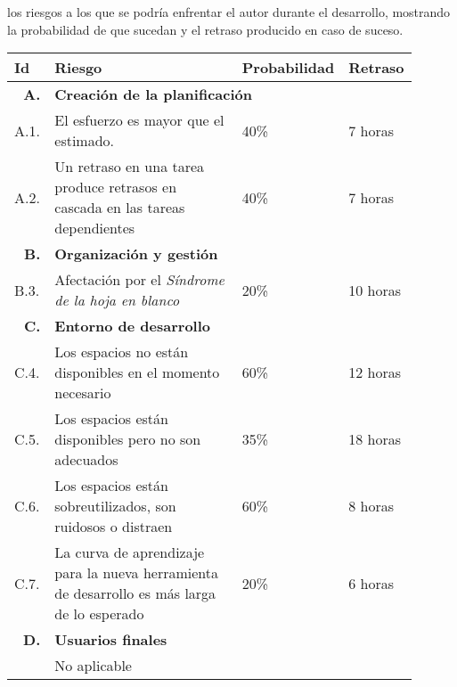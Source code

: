 	
	los riesgos a los que se podría enfrentar el autor durante el desarrollo, mostrando la probabilidad de que sucedan y el retraso producido en caso de suceso.
	
	\begin{table}[H]
	  \centering 
	  \begin{tabular}{p{0.1\linewidth}p{0.5\linewidth}p{0.15\linewidth}p{0.15\linewidth}}
  	    \multicolumn{1}{l}{\cellcolor{black!30}\textbf{Id}} &
	    \multicolumn{1}{l}{\cellcolor{black!30}\textbf{Riesgo}} & 
	 	\multicolumn{1}{c}{\cellcolor{black!30}\textbf{Probabilidad}} &
 	 	\multicolumn{1}{c}{\cellcolor{black!30}\textbf{Retraso}}
	 	\\	 
	    \toprule
   	    
   	    \multicolumn{1}{r}{\cellcolor{black!30}\textbf{A. }} &
		\multicolumn{3}{l}{\cellcolor{black!30}\textbf{Creación de la planificación}}\\
		A.1. &El esfuerzo es mayor que el estimado.											&	40\%	&	7 horas\\
		A.2. &Un retraso en una tarea produce retrasos en cascada en las tareas dependientes 	&	40\%	&	7 horas\\
		
		\multicolumn{1}{r}{\cellcolor{black!30}\textbf{B. }} &
		\multicolumn{3}{l}{\cellcolor{black!30}\textbf{Organización y gestión}}\\
		B.3. &Afectación por el \textit{Síndrome de la hoja en blanco}							&	20\%	&	10 horas\\
		
		\multicolumn{1}{r}{\cellcolor{black!30}\textbf{C. }} &
		\multicolumn{3}{l}{\cellcolor{black!30}\textbf{Entorno de desarrollo}}\\
		C.4. &Los espacios no están disponibles en el momento necesario						&	60\%	&	12 horas\\
		C.5. &Los espacios están disponibles pero no son adecuados								&	35\%	&	18 horas\\
		C.6. &Los espacios están sobreutilizados, son ruidosos o distraen						&	60\%	&	8 horas\\
		C.7. &La curva de aprendizaje para la nueva herramienta de desarrollo es más larga de lo esperado	&	20\%	&	6 horas\\
		
		\multicolumn{1}{r}{\cellcolor{black!30}\textbf{D. }} &
		\multicolumn{3}{l}{\cellcolor{black!30}\textbf{Usuarios finales}}\\
		&No aplicable&&\\
		

\end{tabular}
\end{table}
